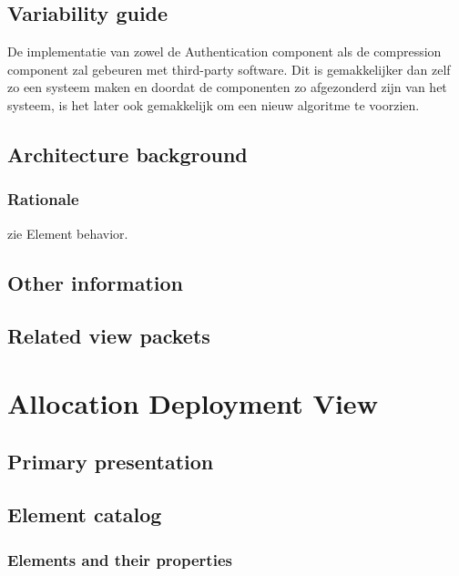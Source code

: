 \documentclass[a4paper,10pt]{book}
\begin{document}
\subsection{Variability guide}
De implementatie van zowel de Authentication component als de compression component zal gebeuren met third-party software. Dit is gemakkelijker dan zelf zo een systeem maken en doordat de componenten zo afgezonderd zijn van het systeem, is het later ook gemakkelijk om een nieuw algoritme te voorzien.\\

\subsection{Architecture background}

\subsubsection{Rationale}
zie Element behavior.


\subsection{Other information}

\subsection{Related view packets}



\section{Allocation Deployment View}

\subsection{Primary presentation}

\subsection{Element catalog}

\subsubsection{Elements and their properties}
\end{document}
